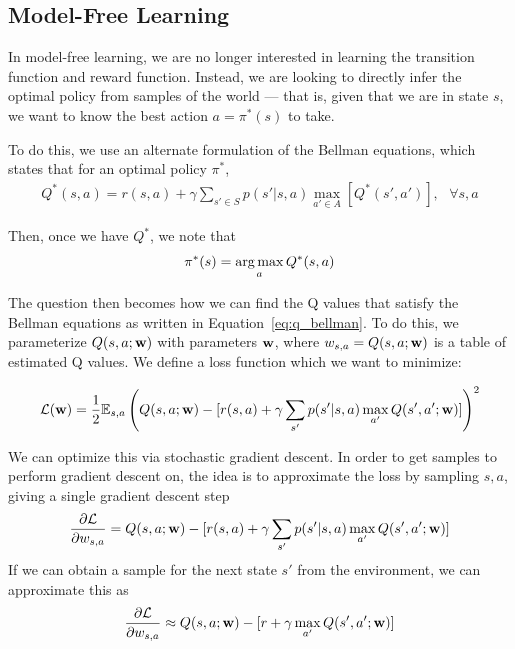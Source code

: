 \documentclass[12pt]{article}
\begin{document}
\vspace{.5pc}




\subsection{Model-Free Learning}

In model-free learning, we are no longer interested in learning the transition function and reward function. Instead, we are looking to directly infer the optimal policy from samples of the world --- that is, given that we are in state $s$, we want to know the best action $a = \pi^*(s)$ to take.

To do this, we use an alternate formulation of the Bellman equations, which states that for an optimal policy $\pi^*$,
\begin{align}
Q^*(s,a) = r(s,a) + \gamma\sum_{s' \in S}p(s' | s, a)\max_{a' \in A}[Q^*(s', a')], \text{  } \forall s,a \label{eq:q_bellman}
\end{align}

Then, once we have $Q^*$, we note that
\begin{align}
\pi^*(s) = \argmax_aQ^*(s, a)
\end{align}

The question then becomes how we can find the Q values that satisfy the Bellman equations as written in Equation~\ref{eq:q_bellman}. To do this, we parameterize $Q(s,a; \mathbf{w})$ with parameters $\mathbf{w}$, where $w_{s,a} = Q(s,a;\mathbf{w})$ is a table of estimated Q values. We define a loss function which we want to minimize:

\begin{align}
\mathcal{L}(\mathbf{w}) = \frac{1}{2}\mathbb{E}_{s,a}\left( Q(s,a; \mathbf{w}) - [r(s,a) + \gamma\sum_{s'}p(s'|s, a)\max_{a'}Q(s', a'; \mathbf{w})
]\right)^2
\end{align}

We can optimize this via stochastic gradient descent. In order to get samples to perform gradient descent on, the idea is to approximate the loss by sampling $s,a$, giving a single gradient descent step
\begin{align}\frac{\partial \mathcal{L}}{\partial w_{s,a}} = Q(s,a;\mathbf{w}) - [r(s,a) + \gamma \sum_{s'}p(s'|s, a)\max_{a'}Q(s', a'; \mathbf{w})]\end{align}
If we can obtain a sample for the next state $s'$ from the environment, we can approximate this as
\begin{align}\frac{\partial \mathcal{L}}{\partial w_{s,a}} \approx Q(s,a;\mathbf{w}) - [r + \gamma \max_{a'}Q(s', a'; \mathbf{w})]\end{align}
\end{document}
